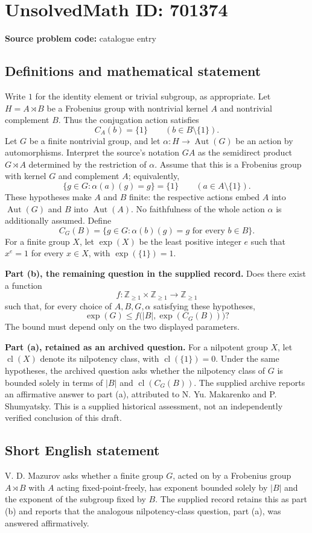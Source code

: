 \documentclass[11pt]{article}
\newcommand{\Z}{\mathbb{Z}}
\begin{document}
\section*{UnsolvedMath ID: 701374}
\textbf{Source problem code:} catalogue entry
\subsection{Definitions and mathematical statement}
Write \(1\) for the identity element or trivial subgroup, as appropriate. Let \(H=A\rtimes B\) be a Frobenius group with nontrivial kernel \(A\) and nontrivial complement \(B\). Thus the conjugation action satisfies
\[
C_A(b)=\{1\}\qquad(b\in B\setminus\{1\}).
\]
Let \(G\) be a finite nontrivial group, and let \(\alpha:H\to\operatorname{Aut}(G)\) be an action by automorphisms. Interpret the source's notation \(GA\) as the semidirect product \(G\rtimes A\) determined by the restriction of \(\alpha\). Assume that this is a Frobenius group with kernel \(G\) and complement \(A\); equivalently,
\[
\{g\in G:\alpha(a)(g)=g\}=\{1\}
\qquad(a\in A\setminus\{1\}).
\]
These hypotheses make \(A\) and \(B\) finite: the respective actions embed \(A\) into \(\operatorname{Aut}(G)\) and \(B\) into \(\operatorname{Aut}(A)\). No faithfulness of the whole action \(\alpha\) is additionally assumed. Define
\[
C_G(B)=\{g\in G:\alpha(b)(g)=g\text{ for every }b\in B\}.
\]
For a finite group \(X\), let \(\exp(X)\) be the least positive integer \(e\) such that \(x^e=1\) for every \(x\in X\), with \(\exp(\{1\})=1\).

\textbf{Part (b), the remaining question in the supplied record.} Does there exist a function
\[
f:\Z_{\geq1}\times\Z_{\geq1}\longrightarrow\Z_{\geq1}
\]
such that, for every choice of \(A,B,G,\alpha\) satisfying these hypotheses,
\[
\exp(G)\leq f\bigl(|B|,\exp(C_G(B))\bigr)?
\]
The bound must depend only on the two displayed parameters.

\textbf{Part (a), retained as an archived question.} For a nilpotent group \(X\), let \(\operatorname{cl}(X)\) denote its nilpotency class, with \(\operatorname{cl}(\{1\})=0\). Under the same hypotheses, the archived question asks whether the nilpotency class of \(G\) is bounded solely in terms of \(|B|\) and \(\operatorname{cl}(C_G(B))\). The supplied archive reports an affirmative answer to part (a), attributed to N. Yu. Makarenko and P. Shumyatsky. This is a supplied historical assessment, not an independently verified conclusion of this draft.
\subsection{Short English statement}
V. D. Mazurov asks whether a finite group \(G\), acted on by a Frobenius group \(A\rtimes B\) with \(A\) acting fixed-point-freely, has exponent bounded solely by \(|B|\) and the exponent of the subgroup fixed by \(B\). The supplied record retains this as part (b) and reports that the analogous nilpotency-class question, part (a), was answered affirmatively.
\end{document}
